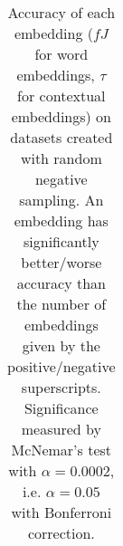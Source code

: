 \documentclass[letterpaper]{article} %
\begin{document}
\begin{table}[h]
\begin{tabular}{l l l l l l l l l l l}
    \end{tabular}   
    \caption{Accuracy of each embedding ($fJ$ for word embeddings, $\tau$ for contextual embeddings) on datasets created with random negative sampling. An embedding has significantly better/worse accuracy than the number of embeddings given by the positive/negative superscripts. Significance measured by McNemar's test with $\alpha = 0.0002$, i.e. $\alpha = 0.05$ with Bonferroni correction.}
    \label{tab:significance_newDatasets_subset_negR} 
\end{table}
\end{document}
